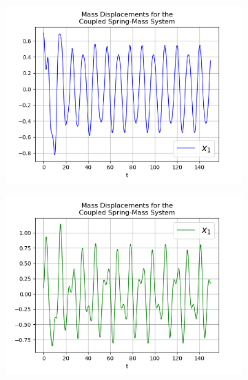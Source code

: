 \documentclass{article}
\begin{document}
\begin{figure}[h!]
  \centering
  \begin{subfigure}[b]{0.45\linewidth}
    \includegraphics[width=\linewidth]{two_springs411.png}
     \caption{}
  \end{subfigure}
  \begin{subfigure}[b]{0.45\linewidth}
    \includegraphics[width=\linewidth]{two_springs412.png}
    \caption{}
  \end{subfigure}
  \begin{subfigure}[b]{0.45\linewidth}

\end{subfigure}
\end{figure}
\end{document}
